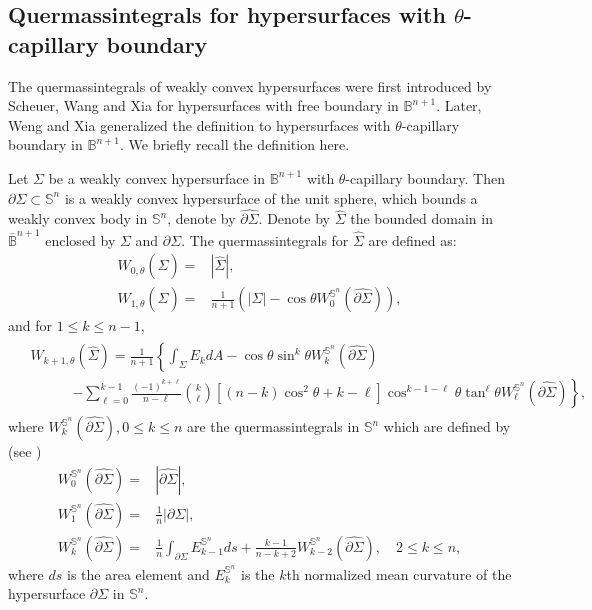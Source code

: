 \documentclass[11pt,reqno]{amsart}
\theoremstyle{definition}
\theoremstyle{remark}
\numberwithin{equation}{section}
\renewcommand{\(}{\left(}
\renewcommand{\)}{\right)}
\renewcommand{\-}{\overline}
\begin{document}
\subsection{Quermassintegrals for hypersurfaces with $\theta$-capillary boundary}\label{sub-sec2.2}
The quermassintegrals of weakly convex hypersurfaces were first introduced  by Scheuer, Wang and Xia \cite{Scheuer-Wang-Xia2018} for hypersurfaces with free boundary in $\mathbb{B}^{n+1}$. Later, Weng and Xia \cite{Weng-Xia2022} generalized the definition to  hypersurfaces with $\theta$-capillary boundary  in $\mathbb{B}^{n+1}$. We briefly recall the definition here. 

Let $\Sigma$ be a weakly convex hypersurface in $\mathbb{B}^{n+1}$ with $\theta$-capillary boundary. Then $\partial\Sigma\subset\mathbb{S}^{n}$ is a weakly convex hypersurface of the unit sphere, which bounds a weakly convex body in $\mathbb{S}^n$, denote by $\widehat{\partial\Sigma}$. Denote by $\widehat{\Sigma}$ the bounded domain in $\bar{\mathbb{B}}^{n+1}$ enclosed by $\Sigma$ and $\widehat{\partial\Sigma}$. The quermassintegrals for $\widehat{\Sigma}$ are defined as: 
\begin{align}
	W_{0,\theta}(\widehat{\Sigma})=&|\widehat{\Sigma}|, \label{s2:quermassintegral-0}\\
	W_{1,\theta}(\widehat{\Sigma})=&\frac{1}{n+1}\left(|\Sigma|-\cos\theta W_0^{\mathbb{S}^n}(\widehat{\partial\Sigma})\right),
\end{align}
and for $1\leq k\leq n-1$,
\begin{align}\label{s2:quermassintegral-2}
	\begin{aligned}
		&W_{k+1,\theta}(\widehat{\Sigma})=\frac{1}{n+1}\left\{\int_{\Sigma}E_{k}dA-\cos\theta\sin^k\theta W_k^{\mathbb{S}^n}(\widehat{\partial\Sigma})\right.  \\
		&\quad \quad \quad \left.-\sum_{\ell=0}^{k-1}\frac{(-1)^{k+\ell}}{n-\ell}\binom{k}{\ell}\left[(n-k)\cos^2\theta+k-\ell\right]\cos^{k-1-\ell}\theta\tan^\ell\theta W_\ell^{\mathbb{S}^n}(\widehat{\partial\Sigma})\right\},
	\end{aligned}
\end{align}
where $W_{k}^{\mathbb{S}^n}(\widehat{\partial \Sigma}), 0\leq k\leq n$ are the quermassintegrals in $\mathbb{S}^n$ which are defined by (see \cite{Sol06})
\begin{align}
	W_0^{\mathbb S^n}(\widehat{\partial \Sigma})=&|\widehat{\partial \Sigma}|, \label{W_0}\\
	W_1^{\mathbb S^n}(\widehat{\partial \Sigma})=&\frac{1}{n}|\partial \Sigma|,\label{W_1}\\
	W_{k}^{\mathbb S^n}(\widehat{\partial \Sigma})=&\frac{1}{n}\int_{\partial \Sigma} E_{k-1}^{\mathbb S^n} ds+\frac{k-1}{n-k+2}W^{\mathbb S^n}_{k-2}(\widehat{\partial \Sigma}), \quad 2\leq k\leq n,\label{W_k}
\end{align}
where $ds$ is the area element and $E_{k}^{\mathbb S^n}$ is the $k$th normalized mean curvature of the hypersurface $\partial \Sigma$ in $\mathbb S^n$.
\end{document}
